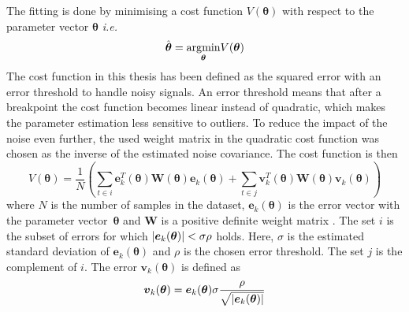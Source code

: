 The fitting is done by minimising a cost function $V(\boldsymbol{\theta})$ with respect to the parameter vector $\boldsymbol{\theta}$ \emph{i.e.}
\begin{equation}
\hat{\boldsymbol{\theta}} = \underset{\boldsymbol{\theta}}{\operatorname*{\arg\!\min}} V(\boldsymbol{\theta})
\end{equation}
The cost function in this thesis has been defined as the squared error with an error threshold to handle noisy signals. An error threshold means that after a breakpoint the cost function becomes linear instead of quadratic, which makes the parameter estimation less sensitive to outliers. To reduce the impact of the noise even further, the used weight matrix in the quadratic cost function was chosen as the inverse of the estimated noise covariance. The cost function is then
\begin{equation}
    V(\boldsymbol{\theta}) = \frac{1}{N} \left( \sum_{t \in i} \boldsymbol{e}^T_k(\boldsymbol{\theta}) \boldsymbol{W}(\boldsymbol{\theta})  \boldsymbol{e}_k(\boldsymbol{\theta}) + \sum_{t \in j} \boldsymbol{v}^T_k(\boldsymbol{\theta}) \boldsymbol{W}(\boldsymbol{\theta})  \boldsymbol{v}_k(\boldsymbol{\theta}) \right)
\end{equation}
where $N$ is the number of samples in the dataset, $\boldsymbol{e}_k(\boldsymbol{\theta})$ is the error vector with the parameter vector~$\boldsymbol{\theta}$ and $\boldsymbol{W}$ is a positive definite weight matrix \citep{ljungtheory}. The set $i$ is the subset of errors for which $|\boldsymbol{e}_k(\boldsymbol{\theta})| < \sigma \rho$ holds. Here, $\sigma$ is the estimated standard deviation of $\boldsymbol{e}_k(\boldsymbol{\theta})$ and $\rho$ is the chosen error threshold. The set $j$ is the complement of $i$. The error $\boldsymbol{v}_k(\boldsymbol{\theta})$ is defined as 
\begin{equation}
\boldsymbol{v}_k(\boldsymbol{\theta}) = \boldsymbol{e}_k(\boldsymbol{\theta}) \sigma\frac{\rho}{\sqrt{|\boldsymbol{e}_k(\boldsymbol{\theta})|}}
\end{equation}

